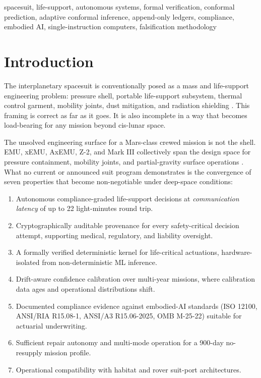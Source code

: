 \documentclass[conference]{IEEEtran}
\theoremstyle{definition}
\theoremstyle{plain}
\theoremstyle{remark}
\begin{document}
\begin{IEEEkeywords}
spacesuit, life-support, autonomous systems, formal verification, conformal prediction, adaptive conformal inference, append-only ledgers, compliance, embodied AI, single-instruction computers, falsification methodology
\end{IEEEkeywords}

\section{Introduction}
\label{sec:intro}

The interplanetary spacesuit is conventionally posed as a mass and life-support engineering problem: pressure shell, portable life-support subsystem, thermal control garment, mobility joints, dust mitigation, and radiation shielding \cite{nasa_xeva,nasa_artemis_axiomspacesuit,nasa_z2,thomas_evolution_2006}. This framing is correct as far as it goes. It is also incomplete in a way that becomes load-bearing for any mission beyond cis-lunar space.

The unsolved engineering surface for a Mars-class crewed mission is not the shell. EMU, xEMU, AxEMU, Z-2, and Mark III collectively span the design space for pressure containment, mobility joints, and partial-gravity surface operations \cite{abramov_eva_2003,thomas_evolution_2006,ross_z2_2014,nasa_xeva,nasa_artemis_axiomspacesuit}. What no current or announced suit program demonstrates is the convergence of seven properties that become non-negotiable under deep-space conditions:

\begin{enumerate}
\item Autonomous compliance-graded life-support decisions at \emph{communication latency} of up to 22 light-minutes round trip.
\item Cryptographically auditable provenance for every safety-critical decision attempt, supporting medical, regulatory, and liability oversight.
\item A formally verified deterministic kernel for life-critical actuations, hardware-isolated from non-deterministic ML inference.
\item Drift-aware confidence calibration over multi-year missions, where calibration data ages and operational distributions shift.
\item Documented compliance evidence against embodied-AI standards (ISO 12100, ANSI/RIA R15.08-1, ANSI/A3 R15.06-2025, OMB M-25-22) suitable for actuarial underwriting.
\item Sufficient repair autonomy and multi-mode operation for a 900-day no-resupply mission profile.
\item Operational compatibility with habitat and rover suit-port architectures.
\end{enumerate}
\end{document}
